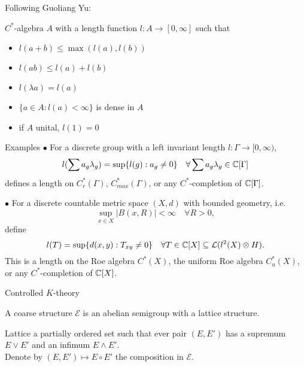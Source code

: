 \begin{frame}
Following Guoliang Yu:
\begin{definition}
$C^*$-algebra $A$ with a length function $l: A \rightarrow [0,\infty]$ such that
\begin{itemize}
\item $l(a+b)\leq \max (l(a), l(b))$
\item $l(ab)\leq l(a)+ l(b)$
\item $l(\lambda a )= l (a)$
\item $\{a\in A : l(a)< \infty\}$ is dense in $A$
\item if $A$ unital, $l(1)=0$
\end{itemize}
\end{definition}
\end{frame}

\begin{frame}{Examples}
$\bullet$ For a discrete group with a left invariant length $l: \Gamma \rightarrow [0,\infty)$, 
\[l(\sum a_g \lambda_g) = \sup \{ l(g) : a_g \neq 0 \} \quad \forall \sum a_g \lambda_g \in \mathbb C [\Gamma]  \]
defines a length on $C_r^*(\Gamma)$, $C_{max}^*(\Gamma)$, or any $C^*$-completion of $\mathbb C [\Gamma]  $.\\

\vspace{0.5in}
 
$\bullet$ For a discrete countable metric space  $(X,d)$ with bounded geometry, i.e. 
\[\sup_{x \in X} |B(x,R)| < \infty \quad \forall R>0 , \]
define
\[l(T) = \sup \{ d(x,y) : T_{xy}\neq 0 \} \quad \forall T\in \mathbb C [X] \subseteq \mathcal L(l^2(X)\otimes H).  \]
This is a length on the Roe algebra $C^*(X)$, the uniform Roe algebra $C_{u}^*(X)$, or any $C^*$-completion of $\mathbb C [X]  $.\\
\end{frame}

\begin{frame}{Controlled $K$-theory}
\begin{definitionfr}
A coarse structure $\mathcal E$ is an abelian semigroup with a lattice structure. \\
\end{definitionfr}
\vspace{0.3 cm}
Lattice a partially ordered set such that ever pair $(E,E')$ has a supremum $E\vee E'$ and an infimum $E\wedge E'$.\\
\vspace{0.3 cm}
Denote by $(E,E')\mapsto E\circ E'$ the composition in $\mathcal E$.
\end{frame}

